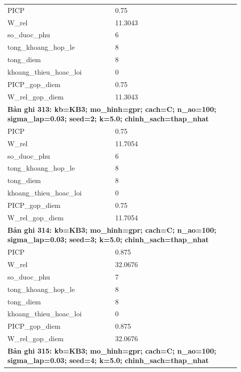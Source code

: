 \begin{longtable}{p{0.43\linewidth}p{0.50\linewidth}}
PICP & 0.75 \\
W\_\allowbreak rel & 11.3043 \\
so\_\allowbreak duoc\_\allowbreak phu & 6 \\
tong\_\allowbreak khoang\_\allowbreak hop\_\allowbreak le & 8 \\
tong\_\allowbreak diem & 8 \\
khoang\_\allowbreak thieu\_\allowbreak hoac\_\allowbreak loi & 0 \\
PICP\_\allowbreak gop\_\allowbreak diem & 0.75 \\
W\_\allowbreak rel\_\allowbreak gop\_\allowbreak diem & 11.3043 \\
\midrule
\multicolumn{2}{p{0.95\linewidth}}{\textbf{Bản ghi 313: kb=KB3; mo\_hinh=gpr; cach=C; n\_ao=100; sigma\_lap=0.03; seed=2; k=5.0; chinh\_sach=thap\_nhat}} \\
PICP & 0.75 \\
W\_\allowbreak rel & 11.7054 \\
so\_\allowbreak duoc\_\allowbreak phu & 6 \\
tong\_\allowbreak khoang\_\allowbreak hop\_\allowbreak le & 8 \\
tong\_\allowbreak diem & 8 \\
khoang\_\allowbreak thieu\_\allowbreak hoac\_\allowbreak loi & 0 \\
PICP\_\allowbreak gop\_\allowbreak diem & 0.75 \\
W\_\allowbreak rel\_\allowbreak gop\_\allowbreak diem & 11.7054 \\
\midrule
\multicolumn{2}{p{0.95\linewidth}}{\textbf{Bản ghi 314: kb=KB3; mo\_hinh=gpr; cach=C; n\_ao=100; sigma\_lap=0.03; seed=3; k=5.0; chinh\_sach=thap\_nhat}} \\
PICP & 0.875 \\
W\_\allowbreak rel & 32.0676 \\
so\_\allowbreak duoc\_\allowbreak phu & 7 \\
tong\_\allowbreak khoang\_\allowbreak hop\_\allowbreak le & 8 \\
tong\_\allowbreak diem & 8 \\
khoang\_\allowbreak thieu\_\allowbreak hoac\_\allowbreak loi & 0 \\
PICP\_\allowbreak gop\_\allowbreak diem & 0.875 \\
W\_\allowbreak rel\_\allowbreak gop\_\allowbreak diem & 32.0676 \\
\midrule
\multicolumn{2}{p{0.95\linewidth}}{\textbf{Bản ghi 315: kb=KB3; mo\_hinh=gpr; cach=C; n\_ao=100; sigma\_lap=0.03; seed=4; k=5.0; chinh\_sach=thap\_nhat}} \\

\end{longtable}
